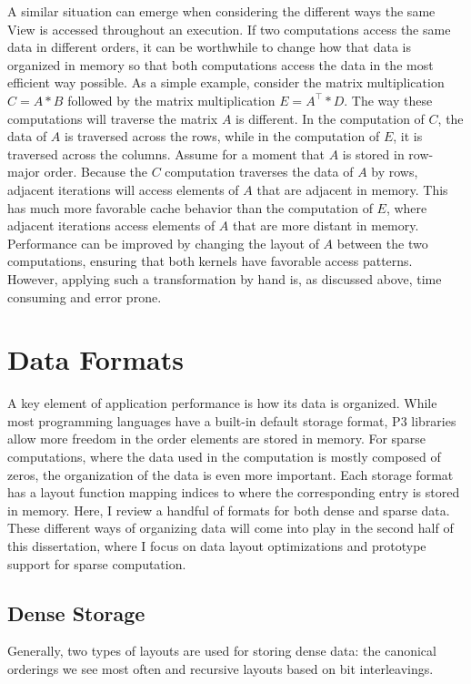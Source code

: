 A similar situation can emerge when considering the different ways the same View is accessed throughout an execution.
If two computations access the same data in different orders, it can be worthwhile to change how that data is organized in memory so that both computations access the data in the most efficient way possible.
As a simple example, consider the matrix multiplication $C = A * B$ followed by the matrix multiplication $E = A^{\top} * D$. 
The way these computations will traverse the matrix $A$ is different. 
In the computation of $C$, the data of $A$ is traversed across the rows, while in the computation of $E$, it is traversed across the columns.
Assume for a moment that $A$ is stored in row-major order.
Because the $C$ computation traverses the data of $A$ by rows, adjacent iterations will access elements of $A$ that are adjacent in memory.
This has much more favorable cache behavior than the computation of $E$, where adjacent iterations access elements of $A$ that are more distant in memory.
Performance can be improved by changing the layout of $A$ between the two computations, ensuring that both kernels have favorable access patterns.
However, applying such a transformation by hand is, as discussed above, time consuming and error prone. 

\section{Data Formats}

A key element of application performance is how its data is organized.
While most programming languages have a built-in default storage format, P3 libraries allow more freedom in the order elements are stored in memory.
For sparse computations, where the data used in the computation is mostly composed of zeros, the organization of the data is even more important.
Each storage format has a layout function mapping indices to where the corresponding entry is stored in memory.
Here, I review a handful of formats for both dense and sparse data. 
These different ways of organizing data will come into play in the second half of this dissertation, where I focus on data layout optimizations and prototype support for sparse computation.

\subsection{Dense Storage}

Generally, two types of layouts are used for storing dense data: the canonical orderings we see most often and recursive layouts based on bit interleavings.

